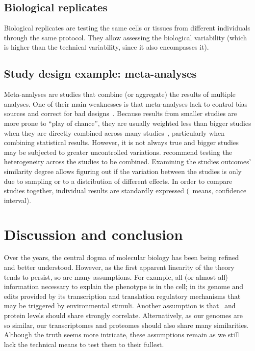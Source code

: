 \subsection{Biological replicates}
Biological replicates are testing the same cells or tissues from different individuals
through the same protocol.
They allow assessing the biological variability
(which is higher than the technical variability, since it also encompasses it).\mybr\

\subsection{Study design example: meta-analyses}

Meta-analyses are studies that combine (or aggregate) the results of multiple analyses.
One of their main weaknesses is
that meta-analyses lack
to control bias sources and correct for bad designs~.
Because results from smaller studies are more prone to \enquote{play of chance},
they are usually weighted less than bigger studies
when they are directly combined across many studies~,
particularly when combining statistical results.
However, it is not always true and bigger studies may be subjected
to greater uncontrolled variations.
\citet{Egger1997-ny} recommend testing the heterogeneity across the studies
to be combined.
Examining the studies outcomes' similarity degree allows figuring out
if the variation between the studies is only due to sampling or
to a distribution of different effects.
In order to compare studies together,
individual results are standardly expressed
(\eg\ means, confidence interval).\mybr\


\section{Discussion and conclusion}\label{sec:bgConcl}

Over the years, the central dogma of molecular biology
has been being refined and better understood.
However, as the first apparent linearity of the theory tends to persist,
so are many assumptions.
For example,
all (or almost all) information necessary to explain the \gls{phenotype} is in the cell;
in its genome and edits provided by
its transcription and translation regulatory mechanisms
that may be triggered by environmental stimuli.
Another assumption is that
\mRNA\ and protein levels should share strongly correlate.
Alternatively, as our genomes are so similar,
our transcriptomes and proteomes should also share many similarities.
Although the truth seems more intricate,
these assumptions remain
as we still lack the technical means to test them to their fullest.\mybr\

